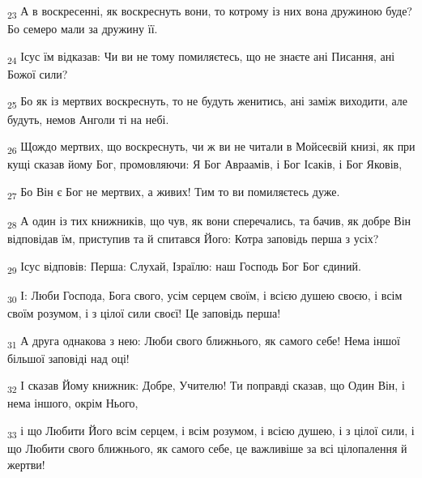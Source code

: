 \begin{tcolorbox}
\textsubscript{23} А в воскресенні, як воскреснуть вони, то котрому із них вона дружиною буде? Бо семеро мали за дружину її.
\end{tcolorbox}
\begin{tcolorbox}
\textsubscript{24} Ісус їм відказав: Чи ви не тому помиляєтесь, що не знаєте ані Писання, ані Божої сили?
\end{tcolorbox}
\begin{tcolorbox}
\textsubscript{25} Бо як із мертвих воскреснуть, то не будуть женитись, ані заміж виходити, але будуть, немов Анголи ті на небі.
\end{tcolorbox}
\begin{tcolorbox}
\textsubscript{26} Щождо мертвих, що воскреснуть, чи ж ви не читали в Мойсеєвій книзі, як при кущі сказав йому Бог, промовляючи: Я Бог Авраамів, і Бог Ісаків, і Бог Яковів,
\end{tcolorbox}
\begin{tcolorbox}
\textsubscript{27} Бо Він є Бог не мертвих, а живих! Тим то ви помиляєтесь дуже.
\end{tcolorbox}
\begin{tcolorbox}
\textsubscript{28} А один із тих книжників, що чув, як вони сперечались, та бачив, як добре Він відповідав їм, приступив та й спитався Його: Котра заповідь перша з усіх?
\end{tcolorbox}
\begin{tcolorbox}
\textsubscript{29} Ісус відповів: Перша: Слухай, Ізраїлю: наш Господь Бог Бог єдиний.
\end{tcolorbox}
\begin{tcolorbox}
\textsubscript{30} І: Люби Господа, Бога свого, усім серцем своїм, і всією душею своєю, і всім своїм розумом, і з цілої сили своєї! Це заповідь перша!
\end{tcolorbox}
\begin{tcolorbox}
\textsubscript{31} А друга однакова з нею: Люби свого ближнього, як самого себе! Нема іншої більшої заповіді над оці!
\end{tcolorbox}
\begin{tcolorbox}
\textsubscript{32} І сказав Йому книжник: Добре, Учителю! Ти поправді сказав, що Один Він, і нема іншого, окрім Нього,
\end{tcolorbox}
\begin{tcolorbox}
\textsubscript{33} і що Любити Його всім серцем, і всім розумом, і всією душею, і з цілої сили, і що Любити свого ближнього, як самого себе, це важливіше за всі цілопалення й жертви!
\end{tcolorbox}
